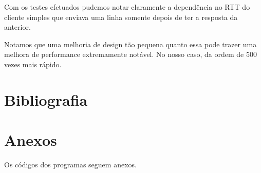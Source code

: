 \documentclass[12pt,a4paper]{article}
\begin{document}
Com os testes efetuados pudemos notar claramente a dependência no RTT
do cliente simples que enviava uma linha somente depois de ter a
resposta da anterior. 

Notamos que uma melhoria de design tão pequena quanto essa pode trazer
uma melhora de performance extremamente notável. No nosso caso, da
ordem de 500 vezes mais rápido.

\section{Bibliografia}
\nocite{beej}




\section{Anexos}

Os códigos dos programas seguem anexos.
\end{document}
